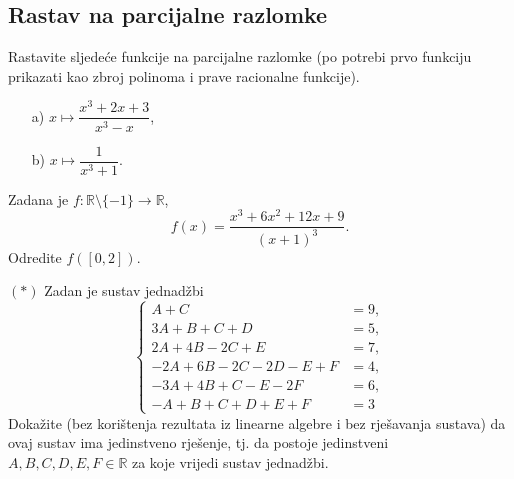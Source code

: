 \subsection*{Rastav na parcijalne razlomke}
\begin{exercise}
Rastavite sljedeće funkcije na parcijalne razlomke (po potrebi prvo funkciju prikazati kao zbroj polinoma i prave racionalne funkcije). 
\begin{itemize}
\item[a)] $x\mapsto \dfrac{x^3+2x+3}{x^3-x}$,
\item[b)] $x\mapsto \dfrac{1}{x^3+1}$.
\end{itemize}
\end{exercise}
\begin{exercise}
Zadana je $f : \mathbb{R}\setminus\{-1\}\to\mathbb{R}$,
$$f(x)=\dfrac{x^3+6x^2+12x+9}{(x+1)^3}.$$
Odredite $f\left([0, 2]\right)$.
\end{exercise}
\begin{exercise} $(*)$ \textbf{}
Zadan je sustav jednadžbi
$$\begin{cases}
A + C&=9,\\
 3A + B + C + D&=5,\\
 2A + 4B - 2C + E&=7,\\
 -2A + 6B - 2C - 2D - E + F&=4,\\
 -3A + 4B + C - E - 2F&=6,\\
 -A + B + C + D + E + F&=3
   \end{cases}$$
Dokažite (bez korištenja rezultata iz linearne algebre i bez rješavanja sustava) da ovaj sustav ima jedinstveno rješenje, tj. da postoje jedinstveni $A, B, C, D, E, F\in \mathbb{R}$ za koje vrijedi sustav jednadžbi.
\end{exercise}

